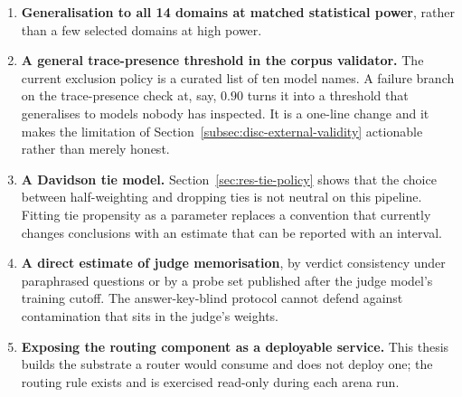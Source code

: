 \begin{enumerate}
\item \textbf{Generalisation to all 14 domains at matched statistical
power}, rather than a few selected domains at high power.

\item \textbf{A general trace-presence threshold in the corpus
validator.} The current exclusion policy is a curated list of ten model
names. A failure branch on the trace-presence check at, say, $0.90$
turns it into a threshold that generalises to models nobody has
inspected. It is a one-line change and it makes the limitation of
Section~\ref{subsec:disc-external-validity} actionable rather than
merely honest.

\item \textbf{A Davidson tie model.} Section~\ref{sec:res-tie-policy}
shows that the choice between half-weighting and dropping ties is not
neutral on this pipeline. Fitting tie propensity as a parameter
replaces a convention that currently changes conclusions with an
estimate that can be reported with an interval.

\item \textbf{A direct estimate of judge memorisation}, by verdict
consistency under paraphrased questions or by a probe set published
after the judge model's training cutoff. The answer-key-blind protocol
cannot defend against contamination that sits in the judge's weights.

\item \textbf{Exposing the routing component as a deployable service.}
This thesis builds the substrate a router would consume and does not
deploy one; the routing rule exists and is exercised read-only during
each arena run.

\end{enumerate}
